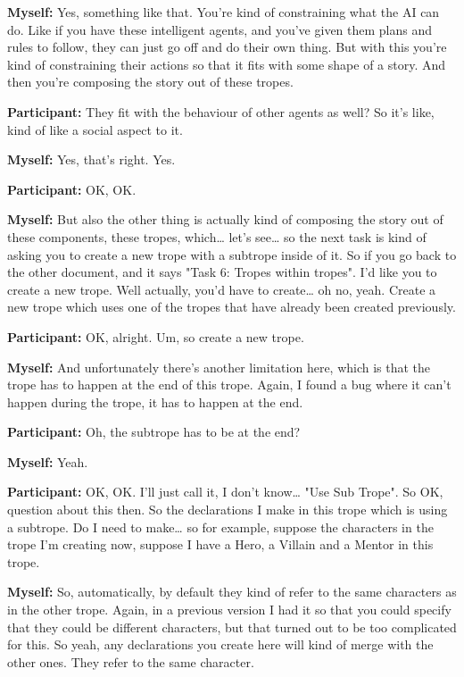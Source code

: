 \documentclass[11pt]{report}
\newcommand{\llabel}[1]{\hypertarget{llineno:#1}{\linelabel{#1}}}
\begin{document}
\begin{linenumbers}
\textbf{Myself:} Yes, something like that. You're kind of constraining what the AI can do. Like if you have these intelligent agents, and you've given them plans and rules to follow, they can just go off and do their own thing. But with this you're kind of constraining their actions so that it fits with some shape of a story. And then you're composing the story out of these tropes.

\textbf{Participant:} They fit with the behaviour of other agents as well? So it's like, kind of like a social aspect to it.

\textbf{Myself:} Yes, that's right. Yes.

\textbf{Participant:} OK, OK.

\textbf{Myself:} But also the other thing is actually kind of composing the story out of these components, these tropes, which\ldots{} let's see\ldots{} so the next task is kind of asking you to create a new trope with a subtrope inside of it. So if you go back to the other document, and it says "Task 6: Tropes within tropes". I'd like you to create a new trope. Well actually, you'd have to create\ldots{} oh no, yeah. Create a new trope which uses one of the tropes that have already been created previously.

\textbf{Participant:} OK, alright. Um, so create a new trope.

\textbf{Myself:} And unfortunately there's another limitation here, which is
that the trope has to happen at the end of this trope. Again, I found a bug
where it can't happen during the trope, it has to happen at the
end.\llabel{lne:bug3e}

\textbf{Participant:} Oh, the subtrope has to be at the end?

\textbf{Myself:} Yeah.

\textbf{Participant:} OK, OK. I'll just call it, I don't know\ldots{} "Use Sub Trope". So OK, question about this then. So the declarations I make in this trope which is using a subtrope. Do I need to make\ldots{} so for example, suppose the characters in the trope I'm creating now, suppose I have a Hero, a Villain and a Mentor in this trope.

\textbf{Myself:} So, automatically, by default they kind of refer to the same characters as in the other trope. Again, in a previous version I had it so that you could specify that they could be different characters, but that turned out to be too complicated for this. So yeah, any declarations you create here will kind of merge with the other ones. They refer to the same character.


\end{linenumbers}
\end{document}

